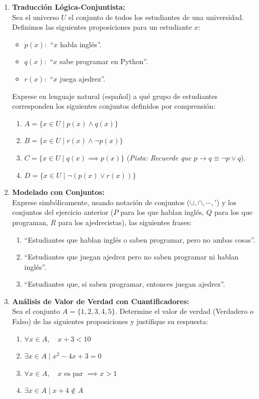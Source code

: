 \begin{enumerate}
    \item \textbf{Traducción Lógica-Conjuntista:} \\
    Sea el universo $U$ el conjunto de todos los estudiantes de una universidad.
    Definimos las siguientes proposiciones para un estudiante $x$:
    \begin{itemize}
        \item $p(x):$ ``$x$ habla inglés''.
        \item $q(x):$ ``$x$ sabe programar en Python''.
        \item $r(x):$ ``$x$ juega ajedrez''.
    \end{itemize}
    Exprese en lenguaje natural (español) a qué grupo de estudiantes corresponden los siguientes conjuntos definidos por comprensión:
    \begin{enumerate}
        \item $A = \{x \in U \mid p(x) \land q(x)\}$
        \item $B = \{x \in U \mid r(x) \land \neg p(x)\}$
        \item $C = \{x \in U \mid q(x) \implies p(x)\}$ \quad (\textit{Pista: Recuerde que $p \to q \equiv \neg p \lor q$}).
        \item $D = \{x \in U \mid \neg(p(x) \lor r(x))\}$
    \end{enumerate}

    \item \textbf{Modelado con Conjuntos:} \\
    Exprese simbólicamente, usando notación de conjuntos ($\cup, \cap, -, '$) y los conjuntos del ejercicio anterior ($P$ para los que hablan inglés, $Q$ para los que programan, $R$ para los ajedrecistas), las siguientes frases:
    \begin{enumerate}
        \item ``Estudiantes que hablan inglés o saben programar, pero no ambas cosas''.
        \item ``Estudiantes que juegan ajedrez pero no saben programar ni hablan inglés''.
        \item ``Estudiantes que, si saben programar, entonces juegan ajedrez''.
    \end{enumerate}
    
    \item \textbf{Análisis de Valor de Verdad con Cuantificadores:} \\
    Sea el conjunto $A = \{1, 2, 3, 4, 5\}$. Determine el valor de verdad (Verdadero o Falso) de las siguientes proposiciones y justifique su respuesta:
    \begin{enumerate}
        \item $\forall x \in A, \quad x + 3 < 10$
        \item $\exists x \in A \mid x^2 - 4x + 3 = 0$
        \item $\forall x \in A, \quad x \text{ es par } \implies x > 1$
        \item $\exists x \in A \mid x + 4 \notin A$
    \end{enumerate}


\end{enumerate}
